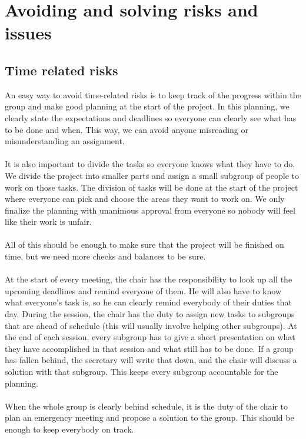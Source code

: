 \section{Avoiding and solving risks and issues}
\subsection{Time related risks}
An easy way to avoid time-related risks is to keep track of the progress within the group and make good planning at the start of the project. In this planning, we clearly state the expectations and deadlines so everyone can clearly see what has to be done and when. This way, we can avoid anyone misreading or misunderstanding an assignment. \\\\
It is also important to divide the tasks so everyone knows what they have to do. We divide the project into smaller parts and assign a small subgroup of people to work on those tasks. The division of tasks will be done at the start of the project where everyone can pick and choose the areas they want to work on. We only finalize the planning with unanimous approval from everyone so nobody will feel like their work is unfair.\\\\
All of this should be enough to make sure that the project will be finished on time, but we need more checks and balances to be sure.\\\\
At the start of every meeting, the chair has the responsibility to look up all the upcoming deadlines and remind everyone of them. He will also have to know what everyone's task is, so he can clearly remind everybody of their duties that day. During the session, the chair  has the duty to assign new tasks to subgroups that are ahead of schedule (this will usually involve helping other subgroups). At the end of each session, every subgroup has to give a short presentation on what they have accomplished in that session and what still has to be done. If a group has fallen behind, the secretary will write that down, and the chair will discuss a solution with that subgroup. This keeps every subgroup accountable for the planning. \\\\
When the whole group is clearly behind schedule, it is the duty of the chair to plan an emergency meeting and propose a solution to the group. This should be enough to keep everybody on track.\\

